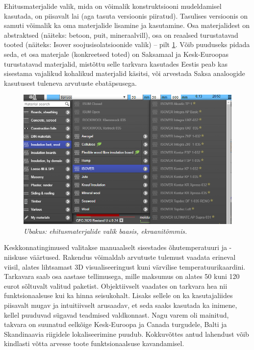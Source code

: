 Ehitusmaterjalide valik, mida on võimalik konstruktsiooni mudeldamisel kasutada, on piisavalt lai 
(aga tasuta versioonis piiratud). Tasulises versioonis on samuti võimalik ka oma materjalide 
lisamine ja kasutamine. Osa materjalidest on abstraktsed (näiteks: betoon, puit, mineraalvill), osa
on reaalsed turustatavad tooted (näiteks: Isover soojusisolatsioonide valik) -- pilt \ref{fig:ubakus_materials}. Võib puuduseks pidada
seda, et osa materjale (konkreetsed toted) on Saksamaal ja Kesk-Euroopas turustatavad materjalid, mistõttu selle 
tarkvara kasutades Eestis peab kas sisestama vajalikud kohalikud materjalid käsitsi, või arvestada Saksa analoogide
kasutusest tuleneva arvutuste ebatäpsusega.
\begin{figure}[ht]
    \centering
    \includegraphics[width=.6\textwidth]{figures/problem_statement/03_ubakus_materials.png}
    \caption[Ubakus tarkvara materjalide valik, ekraanitõmmis]{\textit{Ubakus: ehitusmaterjalide valik baasis, ekraanitõmmis.}}
    \label{fig:ubakus_materials}
\end{figure}

Keskkonnatingimused valitakse manuaalselt sisestades õhutemperatuuri ja -niiskuse väärtused. Rakendus võimaldab arvutuste tulemust
vaadata erineval viisil, alates lihtsamast 3D visualiseeringust kuni värvilise temperatuurikaardini. Tarkavara saab osa aastase 
tellimusega, mille maksumus on alates 50 kuni 120 eurot sõltuvalt valitud paketist. Objektiivselt vaadates on tarkvara hea nii
funktsionaalsuse kui ka hinna seisukohalt. Lisaks sellele on ka kasutajaliides piisavalt mugav ja intuitiivselt arusaadav,
et seda saaks kasutada ka inimene, kellel puuduvad sügavad teadmised valdkonnast. Nagu varem oli mainitud, 
takvara on suunatud eelkõige Kesk-Euroopa ja Canada turgudele, Balti ja Skandinaavia riigidele lokaliseerimine puudub. Kokkuvõttes
antud lahendust võib kindlasti võtta arvesse toote funktsionaalsuse kavandamisel.

